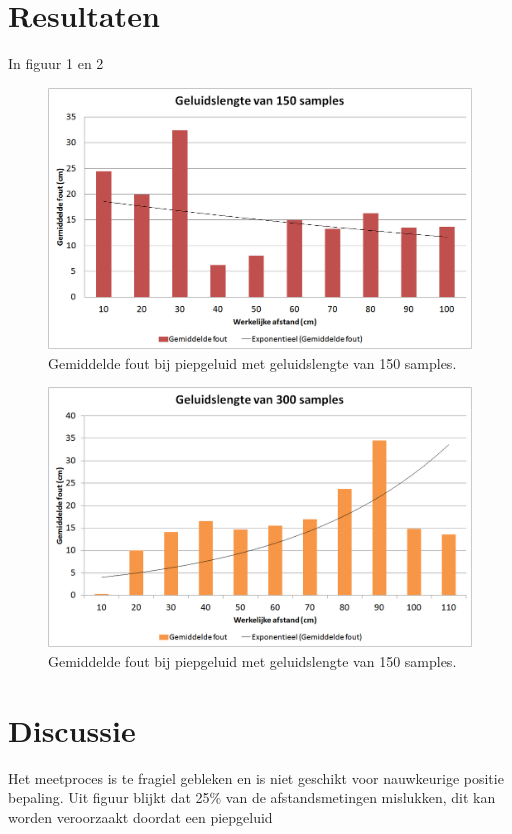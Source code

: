 \documentclass[12pt]{article}
\begin{document}
\section{Resultaten}
\label{sec:resultaten}
In figuur 1 en 2 
\begin{figure}[h]
\centering
\includegraphics[scale=0.4]{150-samples}
\caption{Gemiddelde fout bij piepgeluid met geluidslengte van 150 samples.}
\end{figure}

\begin{figure}[h]
\centering
\includegraphics[scale=0.4]{300-samples}
\caption{Gemiddelde fout bij piepgeluid met geluidslengte van 150 samples.}
\end{figure}

\section{Discussie}
\label{sec:discussie}

Het meetproces is te fragiel gebleken en is niet geschikt voor nauwkeurige positie bepaling. Uit figuur blijkt dat 25\% van de afstandsmetingen mislukken, dit kan worden veroorzaakt doordat een piepgeluid 
\end{document}
